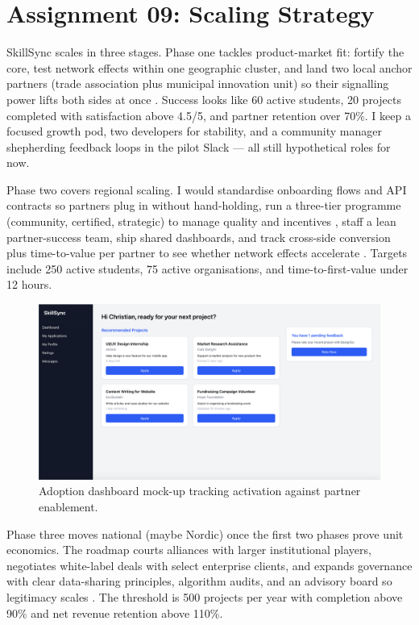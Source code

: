 \section*{Assignment 09: Scaling Strategy}

SkillSync scales in three stages. Phase one tackles product-market fit: fortify the core, test network effects within one geographic cluster, and land two local anchor partners (trade association plus municipal innovation unit) so their signalling power lifts both sides at once \citep{Choudary2016,Reillier2017}. Success looks like 60 active students, 20 projects completed with satisfaction above 4.5/5, and partner retention over 70\%. I keep a focused growth pod, two developers for stability, and a community manager shepherding feedback loops in the pilot Slack --- all still hypothetical roles for now.

Phase two covers regional scaling. I would standardise onboarding flows and API contracts so partners plug in without hand-holding, run a three-tier programme (community, certified, strategic) to manage quality and incentives \citep{HagiuWright2013}, staff a lean partner-success team, ship shared dashboards, and track cross-side conversion plus time-to-value per partner to see whether network effects accelerate \citep{ShapiroVarian1999,Lecture12}. Targets include 250 active students, 75 active organisations, and time-to-first-value under 12 hours.

\begin{figure}[H]
  \centering
  \includegraphics[width=0.75\linewidth]{figures/Student-Dashboard.png}
  \caption{Adoption dashboard mock-up tracking activation against partner enablement.}
  \label{fig:scaling-dashboard}
\end{figure}

Phase three moves national (maybe Nordic) once the first two phases prove unit economics. The roadmap courts alliances with larger institutional players, negotiates white-label deals with select enterprise clients, and expands governance with clear data-sharing principles, algorithm audits, and an advisory board so legitimacy scales \citep{Srnicek2017,Zuboff2019}. The threshold is 500 projects per year with completion above 90\% and net revenue retention above 110\%.

